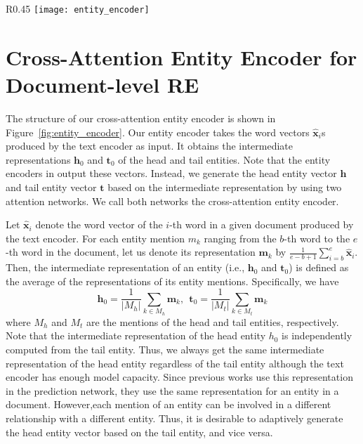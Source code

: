 \documentclass[11pt]{article}
\newcommand{\vect}[1]{\boldsymbol{\mathbf{#1}}}
\renewcommand{\figurename}{Figure}
\begin{document}
\begin{wrapfigure}{R}{0.45\textwidth}
\texttt{[image: entity\_encoder]}
\caption{Cross-attention entity encoder \label{fig:entity_encoder}}
\end{wrapfigure}


\section{Cross-Attention Entity Encoder for Document-level RE}
The structure of our cross-attention entity encoder is shown in \figurename~\ref{fig:entity_encoder}.
Our entity encoder takes the word vectors $\hat{\vect{x}}_i$s produced by the text encoder as input.
It obtains the intermediate representations $\vect{h}_0$ and $\vect{t}_0$ of the head and tail entities.
Note that the entity encoders in \cite{yao2019docred,wang2019fine} output these vectors.
Instead, we generate the head entity vector $\vect{h}$ and tail entity vector $\vect{t}$ based on the intermediate representation by using two attention networks.
We call both networks the cross-attention entity encoder.



Let $\hat{\vect{x}}_i$ denote the word vector of the $i$-th word in a given document produced by the text encoder.
For each entity mention $m_k$ ranging from the $b$-th word to the $e$-th word in the document, let us denote its representation $\vect{m}_k$ by $\frac{1}{e-b+1} \sum_{i=b}^{e}{\hat{\vect{x}}_i}$. Then, the intermediate representation of an entity (i.e., $\vect{h}_0$ and $\vect{t}_0$) is defined as the average of the representations of its entity mentions.
Specifically, we have
\begin{equation*}
\vect{h}_0 = \frac{1}{|M_h|} \sum_{k \in M_{h}}{\vect{m}_k},~~\vect{t}_0 = \frac{1}{|M_t|} \sum_{k \in M_{t}}{\vect{m}_k}
\end{equation*}
where $M_{h}$ and $M_{t}$ are the mentions of the head and tail entities, respectively.
Note that the intermediate representation of the head entity $h_0$ is independently computed from the tail entity.
Thus, we always get the same intermediate representation of the head entity regardless of the tail entity although the text encoder has enough model capacity.
Since previous works \cite{yao2019docred,wang2019fine} use this representation in the prediction network, they use the same representation for an entity in a document.
However,each mention of an entity can be involved in a different relationship with a different entity.
Thus, it is desirable to adaptively generate the head entity vector based on the tail entity, and vice versa.
\end{document}
